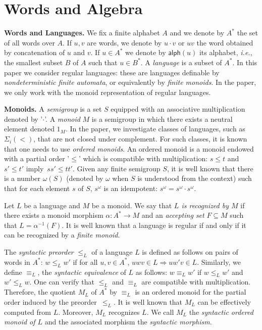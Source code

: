 \documentclass[envcountsame]{llncs}
\newcommand{\siwi}{\ensuremath{\Sigma_{i}(<)}\xspace}
\newcommand\lmo{\ensuremath{\leqslant}\xspace}
\newcommand\content[1]{\ensuremath{\contentmorphism(#1)}}
\newcommand\contentmorphism{\ensuremath{\textsf{alph}}}
\begin{document}
\section{Words and Algebra}
\label{sec:words}
\newcommand\one{\textup{1}}

\medskip
\noindent
{\textbf{Words and Languages.}} We fix a finite alphabet $A$ and we
denote by $A^{*}$ the set of all words over $A$. If $u,v$ are words, we 
denote by $u \cdot v$ or $uv$ the word obtained by concatenation of $u$ and
$v$. If $u \in A^*$ we denote by \content{u} its alphabet, \emph{i.e.}, the
smallest subset $B$ of $A$ such that $u\in B^*$. A \emph{language} is a subset of $A^*$. In
this paper we consider regular languages: these are languages
definable by \emph{nondeterministic finite automata}, or
equivalently by \emph{finite monoids}. In the paper, we only work with
the monoid representation of regular languages.


\medskip
\noindent
{\textbf{Monoids.}} A \emph{semigroup} is a set $S$ equipped with an
associative multiplication denoted by '$\cdot$'. A \emph{monoid} $M$
is a semigroup in which there exists a neutral element denoted
$1_M$. In the paper, we investigate classes of languages, such as
\siwi, that are not closed under complement. For such classes, it is
known that one needs to use \emph{ordered monoids}.  An ordered
monoid is a monoid endowed with a partial order '$\lmo$' which is
compatible with multiplication: $s\lmo t$ and $s'\lmo t'$
imply~$ss'\lmo tt'$.
Given any finite semigroup $S$, it is well known
that there is a number $\omega(S)$ (denoted by $\omega$ when $S$ is
understood from the context) such that for each element $s$ of $S$,
$s^\omega$ is an idempotent: $s^\omega = s^\omega \cdot s^\omega$. 

Let $L$ be a language and $M$ be a monoid. We say that \emph{$L$ is
  recognized by $M$} if there exists a monoid morphism $\alpha : A^*
\rightarrow M$ and an \emph{accepting set} $F \subseteq M$ such that
$L=\alpha^{-1}(F)$. It is well known that a language is regular if and only if it
can be recognized by a \emph{finite monoid}.



\medskip
{} The \emph{syntactic preorder} $\lmo_L$ of a language $L$ is defined as follows
on pairs of words in $A^*$: $w \lmo_L w'$ if for all $u,v \in A^*$, $uwv \in L
\Rightarrow uw'v \in L$. Similarly, we define $\equiv_L$, the \emph{syntactic
  equivalence} of $L$ as follows: $w \equiv_L w'$ if $w \lmo_L w'$ and $w'
\lmo_L w$. One can verify that $\lmo_L$ and $\equiv_L$ are compatible with
multiplication. Therefore, the quotient $M_L$ of $A^*$ by $\equiv_L$ is an
ordered monoid for the partial order induced by the preorder~$\lmo_L$.  It is
well known that $M_L$ can be effectively computed from $L$. Moreover, $M_L$
recognizes $L$. We call $M_L$ the \emph{syntactic ordered monoid of $L$} and
the associated morphism the \emph{syntactic morphism}.
\end{document}
